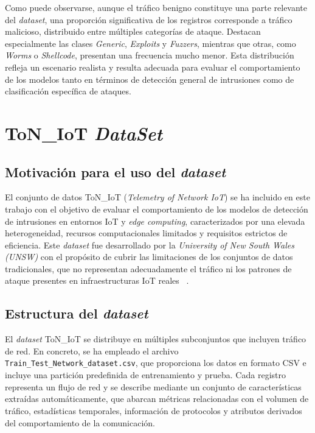 Como puede observarse, aunque el tráfico benigno constituye una parte relevante del \textit{dataset}, una proporción significativa de los registros corresponde a tráfico malicioso, distribuido entre múltiples categorías de ataque. Destacan especialmente las clases \emph{Generic}, \emph{Exploits} y \emph{Fuzzers}, mientras que otras, como \emph{Worms} o \emph{Shellcode}, presentan una frecuencia mucho menor. Esta distribución refleja un escenario realista y resulta adecuada para evaluar el comportamiento de los modelos tanto en términos de detección general de intrusiones como de clasificación específica de ataques.


\section{ToN\_IoT \textit{DataSet}}

\subsection{Motivación para el uso del \textit{dataset}}

El conjunto de datos ToN\_IoT (\emph{Telemetry of Network IoT}) se ha incluido en este trabajo con el objetivo de evaluar el comportamiento de los modelos de detección de intrusiones en entornos IoT y \emph{edge computing}, caracterizados por una elevada heterogeneidad, recursos computacionales limitados y requisitos estrictos de eficiencia. Este \textit{dataset} fue desarrollado por la \emph{University of New South Wales (UNSW)} con el propósito de cubrir las limitaciones de los conjuntos de datos tradicionales, que no representan adecuadamente el tráfico ni los patrones de ataque presentes en infraestructuras IoT reales ~\cite{ton-iot}.

\subsection{Estructura del \textit{dataset}}

El \textit{dataset} ToN\_IoT se distribuye en múltiples subconjuntos que incluyen tráfico de red. En concreto, se ha empleado el archivo \texttt{Train\_Test\_Network\_dataset.csv}, que proporciona los datos en formato CSV e incluye una partición predefinida de entrenamiento y prueba. Cada registro representa un flujo de red y se describe mediante un conjunto de características extraídas automáticamente, que abarcan métricas relacionadas con el volumen de tráfico, estadísticas temporales, información de protocolos y atributos derivados del comportamiento de la comunicación.

